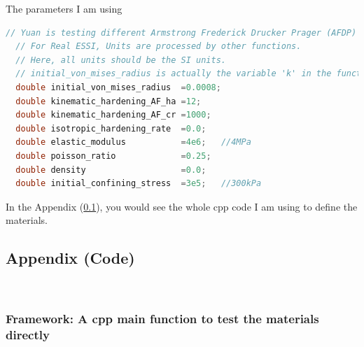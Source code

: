 \documentclass[fleqn,11pt]{article}
\begin{document}
\newpage

The parameters I am using
\begin{lstlisting}[language=C++, frame=single] 
  // Yuan is testing different Armstrong Frederick Drucker Prager (AFDP) parameters:
  // For Real ESSI, Units are processed by other functions.
  // Here, all units should be the SI units.
  // initial_von_mises_radius is actually the variable 'k' in the function of yield suface 
  double initial_von_mises_radius  =0.0008;
  double kinematic_hardening_AF_ha =12;   
  double kinematic_hardening_AF_cr =1000; 
  double isotropic_hardening_rate  =0.0;
  double elastic_modulus           =4e6;   //4MPa   
  double poisson_ratio             =0.25;
  double density                   =0.0;
  double initial_confining_stress  =3e5;   //300kPa
\end{lstlisting}


In the Appendix (\ref{sec_Appendix}), you would see the whole cpp code I am using to define the materials.

\newpage
\subsection{Appendix (Code)} \label{sec_Appendix} ~


\subsubsection{Framework: A cpp main function to test the materials directly} ~
\end{document}
